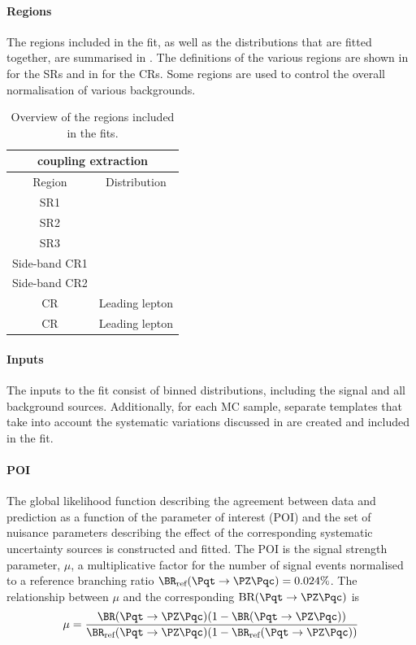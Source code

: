 \paragraph{Regions} The regions included in the fit, as well as the
distributions that are fitted together, are summarised in .
The definitions of the various regions are shown in
 for the SRs and in  for the CRs. 
Some regions are used to control the overall normalisation of various
backgrounds.

\begin{table}[htbp]
	\small
	\centering
	\begin{tabular}{cc}
		\toprule
		\multicolumn{2}{c}{\tZc coupling extraction} \\
		\midrule
		Region & Distribution \\
		\midrule
		SR1 \tZc & \Done  \\
		SR2 \tZc & \DtwoC  \\
		SR3 \tZc & \Dthree  \\
		Side-band CR1 \tZc & \Done  \\
		Side-band CR2 & \DtwoC  \\
		\ttZ CR & Leading lepton \pt  \\
		\ttbar CR & Leading lepton \pt  \\
		\bottomrule
	\end{tabular}
	\caption{
	Overview of the regions included in the fits.}%
\label{tab:fitregions}
\end{table}

\paragraph{Inputs} The inputs to the fit consist of binned
distributions, including the signal and all background sources.
Additionally, for each MC sample, separate templates that take into
account the systematic variations discussed in 
are created and included in the fit. 

\paragraph{POI} The global likelihood function describing the
agreement between data and prediction as a function of the parameter
of interest (POI) and the set of nuisance parameters describing the
effect of the corresponding systematic uncertainty sources is
constructed and fitted. The POI is the signal strength parameter, $\mu$,
a multiplicative factor for the number of signal events normalised to a reference branching ratio
$\mathrm{\BR_{\text{ref}}(\Pqt\rightarrow\PZ\Pqc)=0.024\%}$.
The relationship between $\mu$ and the corresponding $\mathrm{BR (\Pqt\rightarrow\PZ\Pqc)}$  is
\begin{equation}
\mathrm{\mu=\frac{\BR(\Pqt\rightarrow\PZ\Pqc)(1-\BR(\Pqt\rightarrow\PZ\Pqc))}{\BR_{\text{ref}}(\Pqt\rightarrow\PZ\Pqc)(1-\BR_{\text{ref}}(\Pqt\rightarrow\PZ\Pqc))}}
\end{equation}

